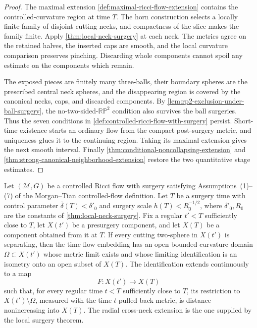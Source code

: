 \begin{proof}
The maximal extension \ref{def:maximal-ricci-flow-extension} contains the
controlled-curvature region at time $T$.  The horn construction selects a
locally finite family of disjoint cutting necks, and compactness of the slice
makes the family finite.  Apply \ref{thm:local-neck-surgery} at each neck.
The metrics agree on the retained halves, the inserted caps are smooth, and
the local curvature comparison preserves pinching.  Discarding whole
components cannot spoil any estimate on the components which remain.

The exposed pieces are finitely many three-balls, their boundary spheres are
the prescribed central neck spheres, and the disappearing region is covered
by the canonical necks, caps, and discarded components.  By
\ref{lem:rp2-exclusion-under-ball-surgery}, the no-two-sided-$\mathbb{RP}^2$
condition also survives the ball surgeries.  Thus the seven
conditions in \ref{def:controlled-ricci-flow-with-surgery} persist.  Short-time
existence starts an ordinary flow from the compact post-surgery metric, and
uniqueness glues it to the continuing region.  Taking its maximal extension
gives the next smooth interval.  Finally
\ref{thm:conditional-noncollapsing-extension} and
\ref{thm:strong-canonical-neighborhood-extension} restore the two quantitative
stage estimates.
\end{proof}

\begin{theorem}
\label{thm:separating-surgery-map}
\notready
Let $({\mathcal M},G)$ be a controlled Ricci flow with surgery satisfying
Assumptions~(1)--(7) of the Morgan--Tian controlled-flow definition.  Let
$T$ be a surgery time with control parameter
$\bar\delta(T)<\delta'_0$ and surgery scale $h(T)<R_0^{-1/2}$, where
$\delta'_0,R_0$ are the constants of
\ref{thm:local-neck-surgery}.  Fix a regular $t'<T$ sufficiently close to
$T$, let $X(t')$ be a presurgery component, and let $X(T)$ be a component
obtained from it at $T$.  If every cutting two-sphere in $X(t')$ is
separating, then the time-flow embedding has an open bounded-curvature
domain $\Omega\subset X(t')$ whose metric limit exists and whose limiting
identification is an isometry onto an open subset of $X(T)$.  The
identification extends continuously to a map
\[
 F\colon X(t')\longrightarrow X(T)
\]
such that, for every regular time $t<T$ sufficiently close to $T$, its
restriction to $X(t')\setminus\Omega$, measured with the time-$t$ pulled-back
metric, is distance nonincreasing into $X(T)$.  The radial cross-neck
extension is the one supplied by the local surgery theorem.
\end{theorem}

